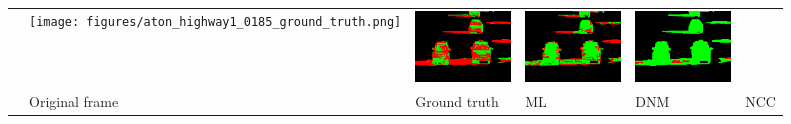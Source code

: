 \documentclass[12pt]{article}
\begin{document}
\begin{landscape}
\begin{table}[t]
\begin{tabular}{m{0.1cm}m{2.3cm}m{2.55cm}|m{2.3cm}m{2.3cm}m{2.3cm}}
      &
      \texttt{[image: figures/aton\_highway1\_0185\_ground\_truth.png]}
      &
      \includegraphics[width=1in]{figures/aton_highway1_0185_ml_results.png}
      &
      \includegraphics[width=1in]{figures/aton_highway1_0185_hsv_results.png}
      &
      \includegraphics[width=1in]{figures/aton_highway1_0185_ncc_results.png}
      \\ 
      & \centering \small Original frame & \centering \small Ground truth &
      \centering \small ML & \centering \small DNM & \centering \small NCC
    \end{tabular}
\end{table}
\end{landscape}
\end{document}

